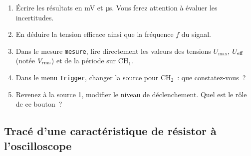 \documentclass[../main/main.tex]{subfiles}
\begin{document}
\begin{enumerate}[label=\sqenumi]
	\item Écrire les résultats en \si{mV} et \si{\micro s}. Vous ferez attention à
	      évaluer les incertitudes.

	\item En déduire la tension efficace ainsi que la fréquence $f$ du signal.
	\item Dans le mesure \texttt{mesure}, lire directement les valeurs des
	      tensions $U_{\max}$, $U_{\rm eff}$ (notée $V_{\rm rms}$) et de la
	      période sur CH$_1$.
	\item Dans le menu \texttt{Trigger}, changer la source pour CH$_2$~: que
	      constatez-vous~?
	\item Revenez à la source 1, modifier le niveau de déclenchement. Quel est le
	      rôle de ce bouton~?
\end{enumerate}

\subsection{Tracé d'une caractéristique de résistor à l'oscilloscope}
\end{document}
